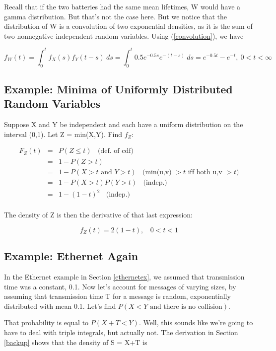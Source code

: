 Recall that if the two batteries had the same mean lifetimes, W would
have a gamma distribution.  But that's not the case here.  But we notice
that the distribution of W is a convolution of two exponential
densities, as it is the sum of two nonnegative independent random
variables.  Using (\ref{convolution}), we have

\begin{equation}
f_W(t) = \int_{0}^t f_X(s) f_Y(t-s) ~ ds
= \int_{0}^t 0.5e^{-0.5s} e^{-(t-s)}~ ds
= e^{-0.5t} - e^{-t}, ~ 0 < t < \infty
\end{equation}

\subsection{Example:  Minima of Uniformly Distributed Random Variables}
\label{minunif}

Suppose X and Y be independent and each have a uniform distribution on
the interval (0,1).  Let Z = min(X,Y).  Find $f_Z$:

\begin{eqnarray}
F_{Z}(t) &=& P(Z \leq t) ~~~~ \textrm{(def. of cdf) }\\
&=& 1-P(Z>t) \\
&=& 1-P(X > t \textrm{ and } Y > t)  ~~~~
\textrm{(min(u,v) $> t$ iff both u,v $> t$)} \\
&=& 1 - P(X > t) P(Y > t) ~~~~ \textrm{(indep.) }\\
&=& 1 - (1-t)^2 ~~~~ \textrm{(indep.) }\\
\end{eqnarray}

The density of Z is then the derivative of that last expression:

\begin{equation}
f_Z(t) = 2(1-t), ~~~~ 0 < t < 1 
\end{equation}

\subsection{Example:  Ethernet Again}

In the Ethernet example in Section \ref{ethernetex}, we assumed that
transmission time was a constant, 0.1.  Now let's account for messages
of varying sizes, by assuming that transmission time T for a message is
random, exponentially distributed with mean 0.1.  Let's find $P(X < Y
\textrm{ and there is no collision})$.

That probability is equal to $P(X+T < Y)$.   Well, this sounds like
we're going to have to deal with triple integrals, but actually not.
The derivation in Section \ref{backup} shows that the density of S = X+T 
is

